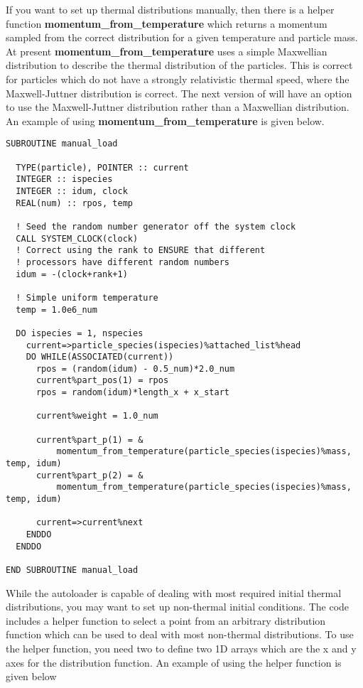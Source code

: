 \documentclass[12pt,a4paper]{article}
\newcommand{\simpleboxverbatim}{\begin{Verbatim}[obeytabs=true,frame=single,
  framerule=0.5mm,rulecolor=\color{warwickmid},formatcom=\color{black}]}
\newcommand{\EPOCH}{{\color{warwickdark}\fontfamily{phv}\selectfont{EPOCH}}}
\begin{document}
If you want to set up thermal distributions manually, then there is a helper
function {\bf momentum\_from\_temperature} which returns a momentum sampled from
the correct distribution for a given temperature and particle mass. At present
{\bf momentum\_from\_temperature} uses a simple Maxwellian distribution to
describe the thermal distribution of the particles. This is correct for
particles which do not have a strongly relativistic thermal speed, where the
Maxwell-Juttner distribution is correct. The next version of {\EPOCH} will have
an option to use the Maxwell-Juttner distribution rather than a Maxwellian
distribution. An example of using {\bf momentum\_from\_temperature} is given
below.

\simpleboxverbatim
SUBROUTINE manual_load

  TYPE(particle), POINTER :: current
  INTEGER :: ispecies
  INTEGER :: idum, clock
  REAL(num) :: rpos, temp

  ! Seed the random number generator off the system clock
  CALL SYSTEM_CLOCK(clock)
  ! Correct using the rank to ENSURE that different
  ! processors have different random numbers
  idum = -(clock+rank+1)

  ! Simple uniform temperature
  temp = 1.0e6_num

  DO ispecies = 1, nspecies
    current=>particle_species(ispecies)%attached_list%head
    DO WHILE(ASSOCIATED(current))
      rpos = (random(idum) - 0.5_num)*2.0_num
      current%part_pos(1) = rpos
      rpos = random(idum)*length_x + x_start

      current%weight = 1.0_num

      current%part_p(1) = &
          momentum_from_temperature(particle_species(ispecies)%mass, temp, idum)
      current%part_p(2) = &
          momentum_from_temperature(particle_species(ispecies)%mass, temp, idum)

      current=>current%next
    ENDDO
  ENDDO

END SUBROUTINE manual_load
\end{Verbatim}

While the autoloader is capable of dealing with most required initial thermal
distributions, you may want to set up non-thermal initial conditions. The code
includes a helper function to select a point from an arbitrary distribution
function which can be used to deal with most non-thermal distributions. To use
the helper function, you need two to define two 1D arrays which are the x and
y axes for the distribution function. An example of using the helper function
is given below
\end{document}
